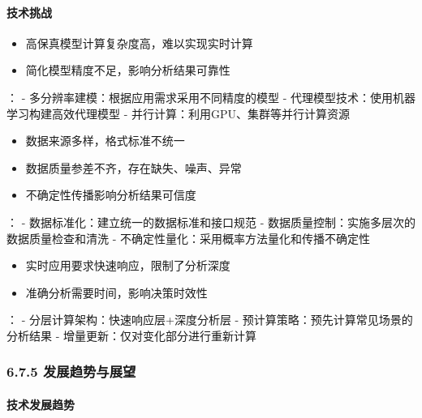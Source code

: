 \hypertarget{ux6280ux672fux6311ux6218}{%
\paragraph{技术挑战}\label{ux6280ux672fux6311ux6218}}


\begin{itemize}
\tightlist
\item
  高保真模型计算复杂度高，难以实现实时计算
\item
  简化模型精度不足，影响分析结果可靠性
\end{itemize}

： - 多分辨率建模：根据应用需求采用不同精度的模型 - 代理模型技术：使用机器学习构建高效代理模型 - 并行计算：利用GPU、集群等并行计算资源


\begin{itemize}
\tightlist
\item
  数据来源多样，格式标准不统一
\item
  数据质量参差不齐，存在缺失、噪声、异常
\item
  不确定性传播影响分析结果可信度
\end{itemize}

： - 数据标准化：建立统一的数据标准和接口规范 - 数据质量控制：实施多层次的数据质量检查和清洗 - 不确定性量化：采用概率方法量化和传播不确定性


\begin{itemize}
\tightlist
\item
  实时应用要求快速响应，限制了分析深度
\item
  准确分析需要时间，影响决策时效性
\end{itemize}

： - 分层计算架构：快速响应层+深度分析层 - 预计算策略：预先计算常见场景的分析结果 - 增量更新：仅对变化部分进行重新计算

\hypertarget{ux53d1ux5c55ux8d8bux52bfux4e0eux5c55ux671b}{%
\subsubsection{6.7.5 发展趋势与展望}\label{ux53d1ux5c55ux8d8bux52bfux4e0eux5c55ux671b}}

\hypertarget{ux6280ux672fux53d1ux5c55ux8d8bux52bf}{%
\paragraph{技术发展趋势}\label{ux6280ux672fux53d1ux5c55ux8d8bux52bf}}

